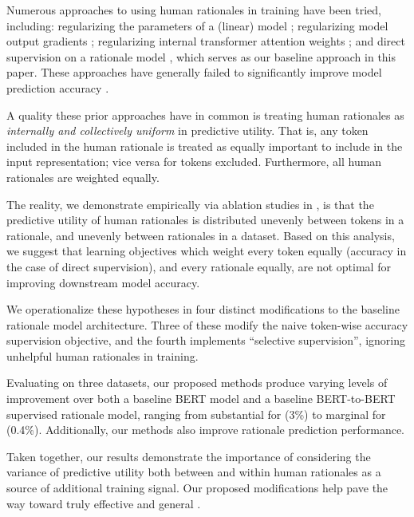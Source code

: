 Numerous approaches to using human rationales in training have been tried, including: regularizing the parameters of a (linear) model \cite{zaidan_using_2007}; regularizing model output gradients \citep{ross_right_2017}; regularizing internal transformer attention weights \cite{jayaram_human_2021}; and direct supervision on a rationale model \cite{deyoung_eraser_2019}, which serves as our baseline approach in this paper. These approaches have generally failed to significantly improve model prediction accuracy \cite{hase_when_2021}. 

A quality these prior approaches have in common is treating human rationales as \textit{internally and collectively uniform} in predictive utility. That is, any token included in the human rationale is treated as equally important to include in the input representation; vice versa for tokens excluded. Furthermore, all human rationales are weighted equally.

The reality, we demonstrate empirically via ablation studies in , is that the predictive utility of human rationales is distributed unevenly between tokens in a rationale, and unevenly between rationales in a dataset. Based on this analysis, we suggest that learning objectives which weight every token equally (accuracy in the case of direct supervision), and every rationale equally, are not optimal for improving downstream model accuracy. 

We operationalize these hypotheses in four distinct modifications to the baseline rationale model architecture. Three of these modify the naive token-wise accuracy supervision objective, and the fourth implements ``selective supervision'', ignoring unhelpful human rationales in training. 








Evaluating on three datasets, our proposed methods produce varying levels of improvement over both a baseline BERT model and a baseline BERT-to-BERT supervised rationale model,
ranging from  substantial for \multirc (3\%) to marginal for \esnli (0.4\%).
Additionally,
 our methods also improve rationale prediction performance. 


Taken together, our results demonstrate the importance of considering the variance of predictive utility both between and within human rationales as a source of additional training signal.
Our proposed modifications 
help pave the way toward truly effective and general \learningfromexplanation.


